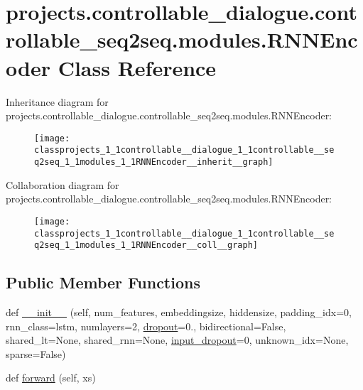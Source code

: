 \hypertarget{classprojects_1_1controllable__dialogue_1_1controllable__seq2seq_1_1modules_1_1RNNEncoder}{}\section{projects.\+controllable\+\_\+dialogue.\+controllable\+\_\+seq2seq.\+modules.\+R\+N\+N\+Encoder Class Reference}
\label{classprojects_1_1controllable__dialogue_1_1controllable__seq2seq_1_1modules_1_1RNNEncoder}


Inheritance diagram for projects.\+controllable\+\_\+dialogue.\+controllable\+\_\+seq2seq.\+modules.\+R\+N\+N\+Encoder\+:
\nopagebreak
\begin{figure}[H]
\begin{center}
\leavevmode
\texttt{[image: classprojects\_1\_1controllable\_\_dialogue\_1\_1controllable\_\_seq2seq\_1\_1modules\_1\_1RNNEncoder\_\_inherit\_\_graph]}
\end{center}
\end{figure}


Collaboration diagram for projects.\+controllable\+\_\+dialogue.\+controllable\+\_\+seq2seq.\+modules.\+R\+N\+N\+Encoder\+:
\nopagebreak
\begin{figure}[H]
\begin{center}
\leavevmode
\texttt{[image: classprojects\_1\_1controllable\_\_dialogue\_1\_1controllable\_\_seq2seq\_1\_1modules\_1\_1RNNEncoder\_\_coll\_\_graph]}
\end{center}
\end{figure}
\subsection*{Public Member Functions}
\begin{DoxyCompactItemize}
\item 
def \hyperlink{classprojects_1_1controllable__dialogue_1_1controllable__seq2seq_1_1modules_1_1RNNEncoder_a7b8489adad0cd4001a02a55caf861295}{\+\_\+\+\_\+init\+\_\+\+\_\+} (self, num\+\_\+features, embeddingsize, hiddensize, padding\+\_\+idx=0, rnn\+\_\+class=\textquotesingle{}lstm\textquotesingle{}, numlayers=2, \hyperlink{classprojects_1_1controllable__dialogue_1_1controllable__seq2seq_1_1modules_1_1RNNEncoder_abe0afe1644874098ad77516fe47cbb9e}{dropout}=0., bidirectional=False, shared\+\_\+lt=None, shared\+\_\+rnn=None, \hyperlink{classprojects_1_1controllable__dialogue_1_1controllable__seq2seq_1_1modules_1_1RNNEncoder_a0bd93798713f88e23d70e41348b5abe3}{input\+\_\+dropout}=0, unknown\+\_\+idx=None, sparse=False)
\item 
def \hyperlink{classprojects_1_1controllable__dialogue_1_1controllable__seq2seq_1_1modules_1_1RNNEncoder_aff331ac57c336c48e5853f16edacb6db}{forward} (self, xs)
\end{DoxyCompactItemize}
